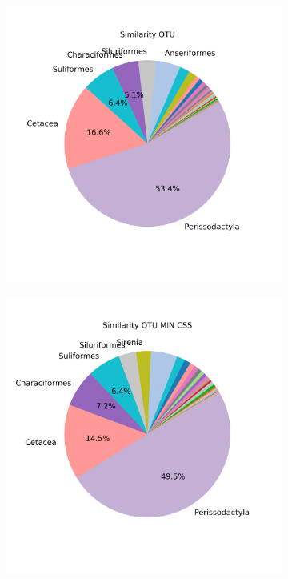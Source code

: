 \begin{figure}[h]
	\centering
	\begin{subfigure}{0.45\textwidth}
		\includegraphics[width=\textwidth]{rfr_sim_mean_pieOTU}
		\caption{}
		\label{fig:simotumean}
	\end{subfigure}
	\begin{subfigure}{0.45\textwidth}
		\includegraphics[width=\textwidth]{rfr_sim_mean_pieOTU MIN CSS}

\end{subfigure}
\end{figure}
